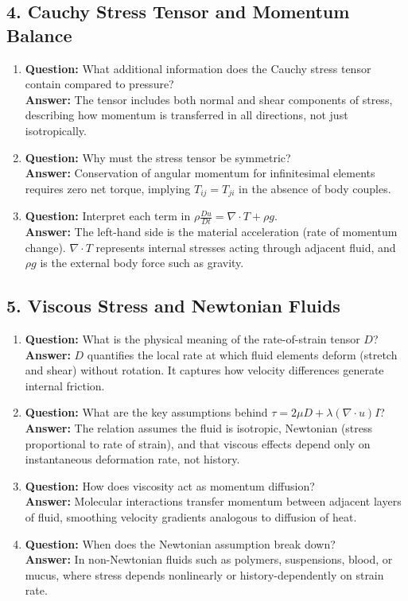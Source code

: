 \documentclass[12pt]{article}
\begin{document}
\subsection*{4. Cauchy Stress Tensor and Momentum Balance}
\begin{enumerate}
\item \textbf{Question:} What additional information does the Cauchy stress tensor contain compared to pressure?\\
\textbf{Answer:} The tensor includes both normal and shear components of stress, describing how momentum is transferred in all directions, not just isotropically.

\item \textbf{Question:} Why must the stress tensor be symmetric?\\
\textbf{Answer:} Conservation of angular momentum for infinitesimal elements requires zero net torque, implying $T_{ij} = T_{ji}$ in the absence of body couples.

\item \textbf{Question:} Interpret each term in $\rho \frac{D u}{D t} = \nabla \cdot T + \rho g$.\\
\textbf{Answer:} The left-hand side is the material acceleration (rate of momentum change). $\nabla \cdot T$ represents internal stresses acting through adjacent fluid, and $\rho g$ is the external body force such as gravity.
\end{enumerate}

\subsection*{5. Viscous Stress and Newtonian Fluids}
\begin{enumerate}
\item \textbf{Question:} What is the physical meaning of the rate-of-strain tensor $D$?\\
\textbf{Answer:} $D$ quantifies the local rate at which fluid elements deform (stretch and shear) without rotation. It captures how velocity differences generate internal friction.

\item \textbf{Question:} What are the key assumptions behind $\tau = 2\mu D + \lambda (\nabla \cdot u)I$?\\
\textbf{Answer:} The relation assumes the fluid is isotropic, Newtonian (stress proportional to rate of strain), and that viscous effects depend only on instantaneous deformation rate, not history.

\item \textbf{Question:} How does viscosity act as momentum diffusion?\\
\textbf{Answer:} Molecular interactions transfer momentum between adjacent layers of fluid, smoothing velocity gradients analogous to diffusion of heat.

\item \textbf{Question:} When does the Newtonian assumption break down?\\
\textbf{Answer:} In non-Newtonian fluids such as polymers, suspensions, blood, or mucus, where stress depends nonlinearly or history-dependently on strain rate.
\end{enumerate}
\end{document}
